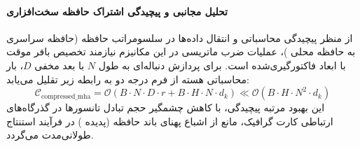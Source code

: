 \paragraph{تحلیل مجانبی و پیچیدگی اشتراک حافظه سخت‌افزاری}
از منظر پیچیدگی محاسباتی و انتقال داده‌ها در سلسومراتب حافظه (حافظه سراسری  به حافظه محلی )، عملیات ضرب ماتریسی در این مکانیزم نیازمند تخصیص بافر موقت با ابعاد فاکتورگیری‌شده است. برای پردازش دنباله‌ای به طول $N$ با بعد مخفی $D$، بار محاسباتی هسته از فرم درجه دو به رابطه زیر تقلیل می‌یابد:
\begin{equation}
\label{eq:complexity_compressed_mha}
\mathcal{C}_{\text{compressed\_mha}} = \mathcal{O}\left( B \cdot N \cdot D \cdot r + B \cdot H \cdot N \cdot d_k \right) \ll \mathcal{O}\left( B \cdot H \cdot N^2 \cdot d_k \right)
\end{equation}
این بهبود مرتبه پیچیدگی، با کاهش چشمگیر حجم تبادل تانسورها در گذرگاه‌های ارتباطی کارت گرافیک، مانع از اشباع پهنای باند حافظه (پدیده ) در فرآیند استنتاج طولانی‌مدت می‌گردد.